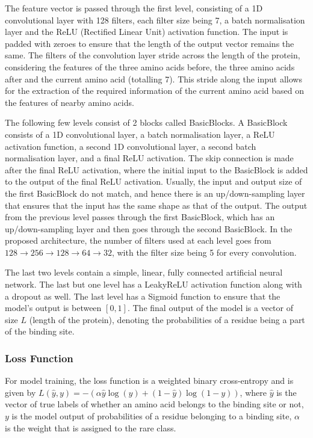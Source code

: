 \documentclass[journal=jacsat,manuscript=article]{achemso}
\begin{document}
The feature vector is passed through the first level, consisting of a 1D convolutional layer with 128 filters, each filter size being 7, a batch normalisation layer and the ReLU (Rectified Linear Unit) activation function. The input is padded with zeroes to ensure that the length of the output vector remains the same. The filters of the convolution layer stride across the length of the protein, considering the features of the three amino acids before, the three amino acids after and the current amino acid (totalling 7). This stride along the input allows for the extraction of the required information of the current amino acid based on the features of nearby amino acids.

The following few levels consist of 2 blocks called BasicBlocks. A BasicBlock consists of a 1D convolutional layer, a batch normalisation layer, a ReLU activation function, a second 1D convolutional layer, a second batch normalisation layer, and a final ReLU activation. The skip connection is made after the final ReLU activation, where the initial input to the BasicBlock is added to the output of the final ReLU activation. Usually, the input and output size of the first BasicBlock do not match, and hence there is an up/down-sampling layer that ensures that the input has the same shape as that of the output. The output from the previous level passes through the first BasicBlock, which has an up/down-sampling layer and then goes through the second BasicBlock. In the proposed architecture, the number of filters used at each level goes from $128 \to 256 \to 128 \to 64 \to 32$, with the filter size being 5 for every convolution.

The last two levels contain a simple, linear, fully connected artificial neural network. The last but one level has a LeakyReLU activation function along with a dropout as well. The last level has a Sigmoid function to ensure that the model's output is between $[0, 1]$. The final output of the model is a vector of size $L$ (length of the protein), denoting the probabilities of a residue being a part of the binding site.

\subsubsection{Loss Function}
\quad For model training, the loss function is a weighted binary cross-entropy and is given by
$L(\hat{y}, y) = -(\alpha\hat{y}\log(y) + (1-\hat{y})\log(1-y))$, where $\hat{y}$ is the vector of true labels of whether an amino acid belongs to the binding site or not, $y$ is the model output of probabilities of a residue belonging to a binding site, $\alpha$ is the weight that is assigned to the rare class.
\end{document}
